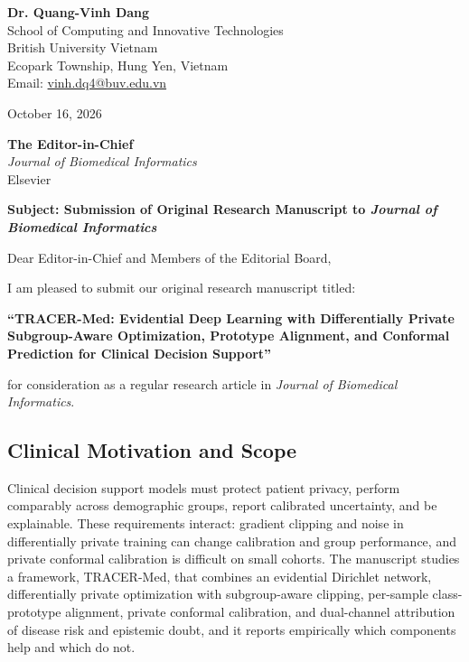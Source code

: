 \documentclass[11pt,a4paper]{article}
\begin{document}
\begin{flushleft}
\textbf{Dr. Quang-Vinh Dang} \\
School of Computing and Innovative Technologies \\
British University Vietnam \\
Ecopark Township, Hung Yen, Vietnam \\
Email: \href{mailto:vinh.dq4@buv.edu.vn}{vinh.dq4@buv.edu.vn}
\end{flushleft}

\vspace{0.5em}
\hfill October 16, 2026

\vspace{0.5em}
\textbf{The Editor-in-Chief} \\
\emph{Journal of Biomedical Informatics} \\
Elsevier

\vspace{1em}
\textbf{Subject: Submission of Original Research Manuscript to \emph{Journal of Biomedical Informatics}}

\vspace{0.5em}
Dear Editor-in-Chief and Members of the Editorial Board,

I am pleased to submit our original research manuscript titled:

\begin{center}
\textbf{``TRACER-Med: Evidential Deep Learning with Differentially Private Subgroup-Aware Optimization, Prototype Alignment, and Conformal Prediction for Clinical Decision Support''}
\end{center}

for consideration as a regular research article in \emph{Journal of Biomedical Informatics}.

\subsection*{Clinical Motivation and Scope}
Clinical decision support models must protect patient privacy, perform comparably across demographic groups, report calibrated uncertainty, and be explainable. These requirements interact: gradient clipping and noise in differentially private training can change calibration and group performance, and private conformal calibration is difficult on small cohorts. The manuscript studies a framework, TRACER-Med, that combines an evidential Dirichlet network, differentially private optimization with subgroup-aware clipping, per-sample class-prototype alignment, private conformal calibration, and dual-channel attribution of disease risk and epistemic doubt, and it reports empirically which components help and which do not.
\end{document}
